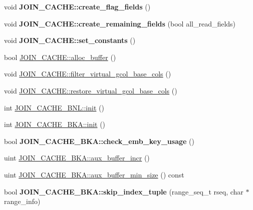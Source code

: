 \begin{DoxyCompactItemize}
void {\bfseries J\+O\+I\+N\+\_\+\+C\+A\+C\+H\+E\+::create\+\_\+flag\+\_\+fields} ()
\item 
\mbox{\label{group__Query__Optimizer_gab3ab87ee19d6e92561f80933563bb147}} 
void {\bfseries J\+O\+I\+N\+\_\+\+C\+A\+C\+H\+E\+::create\+\_\+remaining\+\_\+fields} (bool all\+\_\+read\+\_\+fields)
\item 
\mbox{\label{group__Query__Optimizer_ga81e30ba1b4cfa2fd22aaf1c5bac90b7e}} 
void {\bfseries J\+O\+I\+N\+\_\+\+C\+A\+C\+H\+E\+::set\+\_\+constants} ()
\item 
bool \mbox{\hyperlink{group__Query__Optimizer_ga5932344e1185abf63788970856f45766}{J\+O\+I\+N\+\_\+\+C\+A\+C\+H\+E\+::alloc\+\_\+buffer}} ()
\item 
void \mbox{\hyperlink{group__Query__Optimizer_gaae89dde6a1925032ade263c27a87529f}{J\+O\+I\+N\+\_\+\+C\+A\+C\+H\+E\+::filter\+\_\+virtual\+\_\+gcol\+\_\+base\+\_\+cols}} ()
\item 
void \mbox{\hyperlink{group__Query__Optimizer_gabfdf6220265d56c5dc44081d89abc73e}{J\+O\+I\+N\+\_\+\+C\+A\+C\+H\+E\+::restore\+\_\+virtual\+\_\+gcol\+\_\+base\+\_\+cols}} ()
\item 
int \mbox{\hyperlink{group__Query__Optimizer_gab3dbb0f8b69dc30985e0d9a0ff94121f}{J\+O\+I\+N\+\_\+\+C\+A\+C\+H\+E\+\_\+\+B\+N\+L\+::init}} ()
\item 
int \mbox{\hyperlink{group__Query__Optimizer_ga327376f63198bf31a770fb89242d49aa}{J\+O\+I\+N\+\_\+\+C\+A\+C\+H\+E\+\_\+\+B\+K\+A\+::init}} ()
\item 
\mbox{\label{group__Query__Optimizer_ga700b94ef76d1152d7ea4816ec7b46299}} 
bool {\bfseries J\+O\+I\+N\+\_\+\+C\+A\+C\+H\+E\+\_\+\+B\+K\+A\+::check\+\_\+emb\+\_\+key\+\_\+usage} ()
\item 
uint \mbox{\hyperlink{group__Query__Optimizer_ga8661280e3da40b2c581ec758c50e1979}{J\+O\+I\+N\+\_\+\+C\+A\+C\+H\+E\+\_\+\+B\+K\+A\+::aux\+\_\+buffer\+\_\+incr}} ()
\item 
uint \mbox{\hyperlink{group__Query__Optimizer_gaef7343f0416360c14c6134867b347c83}{J\+O\+I\+N\+\_\+\+C\+A\+C\+H\+E\+\_\+\+B\+K\+A\+::aux\+\_\+buffer\+\_\+min\+\_\+size}} () const
\item 
\mbox{\label{group__Query__Optimizer_ga552f68c5d61c00714ca823ff05cd7847}} 
bool {\bfseries J\+O\+I\+N\+\_\+\+C\+A\+C\+H\+E\+\_\+\+B\+K\+A\+::skip\+\_\+index\+\_\+tuple} (range\+\_\+seq\+\_\+t rseq, char $\ast$range\+\_\+info)

\end{DoxyCompactItemize}
